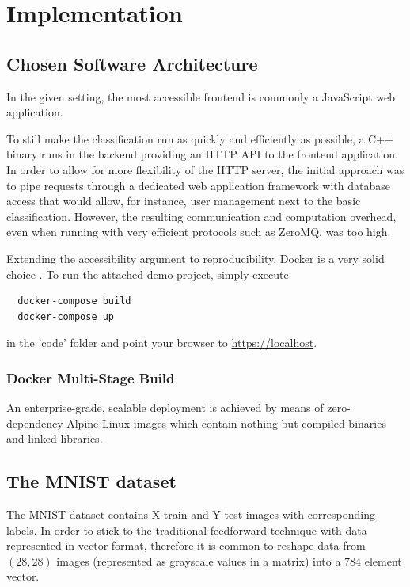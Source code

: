 \chapter{Implementation}
\label{chap:implementation}

\section{Chosen Software Architecture}
In the given setting, the most accessible frontend is commonly a JavaScript web application.

To still make the classification run as quickly and efficiently as possible, a C++ binary runs
in the backend providing an HTTP API to the frontend application.
In order to allow for more flexibility of the HTTP server, the initial approach was to
pipe requests through a dedicated web application framework with database access
that would allow, for instance, user management next to the basic classification.
However, the resulting communication and computation overhead, even when running with very
efficient protocols such as ZeroMQ, was too high.

Extending the accessibility argument to reproducibility, Docker is a very solid choice \parencite{using-docker-in-science}.
To run the attached demo project, simply execute
\begin{verbatim}
  docker-compose build
  docker-compose up
\end{verbatim}
in the 'code' folder and point your browser to \url{https://localhost}.

\subsection{Docker Multi-Stage Build}
An enterprise-grade, scalable deployment is achieved by means of zero-dependency
Alpine Linux images which contain nothing but compiled binaries and linked libraries.

\section{The MNIST dataset}
The MNIST dataset \parencite{mnist-original} contains X train and Y test images with corresponding labels.
In order to stick to the traditional feedforward technique with data represented
in vector format, therefore it is common to reshape data from $(28, 28)$ images (represented as grayscale values in a matrix)
into a $784$ element vector.

